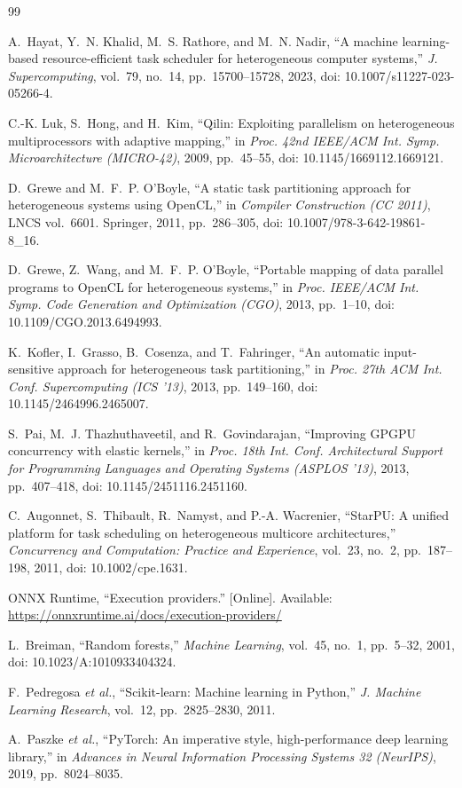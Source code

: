 \documentclass[conference]{IEEEtran}
\begin{document}
\begin{thebibliography}{99}

A.~Hayat, Y.~N. Khalid, M.~S. Rathore, and M.~N. Nadir, ``A machine learning-based resource-efficient task scheduler for heterogeneous computer systems,'' \emph{J. Supercomputing}, vol.~79, no.~14, pp.~15700--15728, 2023, doi: 10.1007/s11227-023-05266-4.

C.-K. Luk, S.~Hong, and H.~Kim, ``Qilin: Exploiting parallelism on heterogeneous multiprocessors with adaptive mapping,'' in \emph{Proc. 42nd IEEE/ACM Int. Symp. Microarchitecture (MICRO-42)}, 2009, pp.~45--55, doi: 10.1145/1669112.1669121.

D.~Grewe and M.~F.~P. O'Boyle, ``A static task partitioning approach for heterogeneous systems using OpenCL,'' in \emph{Compiler Construction (CC 2011)}, LNCS vol.~6601. Springer, 2011, pp.~286--305, doi: 10.1007/978-3-642-19861-8\_16.

D.~Grewe, Z.~Wang, and M.~F.~P. O'Boyle, ``Portable mapping of data parallel programs to OpenCL for heterogeneous systems,'' in \emph{Proc. IEEE/ACM Int. Symp. Code Generation and Optimization (CGO)}, 2013, pp.~1--10, doi: 10.1109/CGO.2013.6494993.

K.~Kofler, I.~Grasso, B.~Cosenza, and T.~Fahringer, ``An automatic input-sensitive approach for heterogeneous task partitioning,'' in \emph{Proc. 27th ACM Int. Conf. Supercomputing (ICS '13)}, 2013, pp.~149--160, doi: 10.1145/2464996.2465007.

S.~Pai, M.~J. Thazhuthaveetil, and R.~Govindarajan, ``Improving GPGPU concurrency with elastic kernels,'' in \emph{Proc. 18th Int. Conf. Architectural Support for Programming Languages and Operating Systems (ASPLOS '13)}, 2013, pp.~407--418, doi: 10.1145/2451116.2451160.

C.~Augonnet, S.~Thibault, R.~Namyst, and P.-A. Wacrenier, ``StarPU: A unified platform for task scheduling on heterogeneous multicore architectures,'' \emph{Concurrency and Computation: Practice and Experience}, vol.~23, no.~2, pp.~187--198, 2011, doi: 10.1002/cpe.1631.

ONNX Runtime, ``Execution providers.'' [Online]. Available: \url{https://onnxruntime.ai/docs/execution-providers/}

L.~Breiman, ``Random forests,'' \emph{Machine Learning}, vol.~45, no.~1, pp.~5--32, 2001, doi: 10.1023/A:1010933404324.

F.~Pedregosa \emph{et al.}, ``Scikit-learn: Machine learning in Python,'' \emph{J. Machine Learning Research}, vol.~12, pp.~2825--2830, 2011.

A.~Paszke \emph{et al.}, ``PyTorch: An imperative style, high-performance deep learning library,'' in \emph{Advances in Neural Information Processing Systems 32 (NeurIPS)}, 2019, pp.~8024--8035.

\end{thebibliography}
\end{document}
